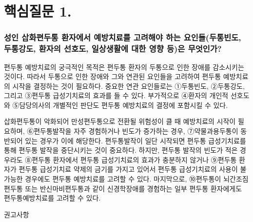 \documentclass[]{book}
\begin{document}
\hypertarget{section-8}{%
\section{핵심질문 1.}\label{section-8}}

\hypertarget{section-9}{%
\subsubsection*{성인 삽화편두통 환자에서 예방치료를 고려해야 하는 요인들(두통빈도, 두통강도, 환자의 선호도, 일상생활에 대한 영향 등)은 무엇인가?}\label{section-9}}

편두통 예방치료의 궁극적인 목적은 편두통 환자의 두통으로 인한 장애를 감소시키는 것이다. 따라서 두통으로 인한 장애와 그와 연관된 요인들을 고려하여 편두통 예방치료의 시작을 결정하는 것이 필요하다. 중요한 연관 요인들로는 ①두통빈도, ②두통강도, 그리고 ③편두통 급성기치료의 효과를 들 수 있다. 부가적으로 ④환자의 개인적 선호도와 ⑤담당의사의 개별적인 판단도 편두통 예방치료의 결정에 포함시킬 수 있다.

삽화편두통이 악화되어 만성편두통으로 전환될 위험성이 클 때 예방치료의 시작이 필요하며, ⑥편두통발작을 자주 경험하거나 빈도가 증가하는 경우, ⑦약물과용두통이 동반되어 있는 경우가 이에 해당한다. 편두통발작이 일단 시작되면 편두통 급성기치료를 통해 편두통 발작을 중단시키는 것이 중요하다. 하지만, 편두통 발작의 빈도가 적은 경우라도 ⑧편두통 환자에서 편두통 급성기치료의 효과가 충분하지 않거나 ⑨편두통 환자가 편두통 급성기치료 약제의 금기를 가지고 있어서 편두통 급성기치료의 사용이 불가능한 경우에도 편두통 예방치료를 고려할 수 있다. 마지막으로, ⑩편두통이 뇌간조짐편두통 또는 반신마비편두통과 같이 신경학장애를 경험하는 일부 편두통 환자에게도 편두통예방치료를 고려할 수 있다.

권고사항
\end{document}

